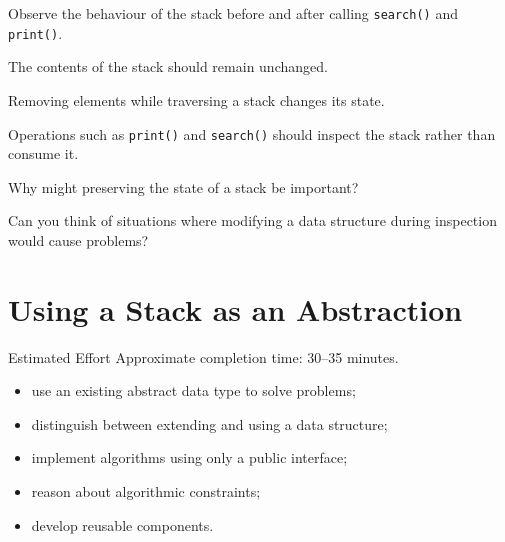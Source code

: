 \documentclass{csc2059practical}
\begin{document}
Observe the behaviour of the stack before and after calling
\texttt{search()} and \texttt{print()}.

The contents of the stack should remain unchanged.

\begin{commonerror}

Removing elements while traversing a stack changes its state.

Operations such as \texttt{print()} and \texttt{search()} should
inspect the stack rather than consume it.

\end{commonerror}

\begin{reflectionbox}

Why might preserving the state of a stack be important?

Can you think of situations where modifying a data structure during
inspection would cause problems?

\end{reflectionbox}


\section{Using a Stack as an Abstraction}

\begin{infobox}{Estimated Effort}
Approximate completion time: 30--35 minutes.
\end{infobox}

\begin{learningoutcomes}

\begin{itemize}

\item use an existing abstract data type to solve problems;

\item distinguish between extending and using a data structure;

\item implement algorithms using only a public interface;

\item reason about algorithmic constraints;

\item develop reusable components.

\end{itemize}

\end{learningoutcomes}
\end{document}
